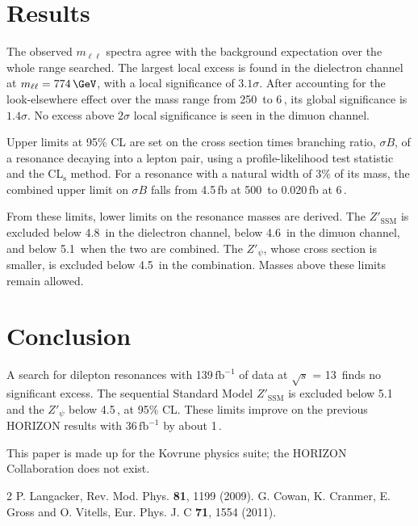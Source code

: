 \documentclass[aps,prd,twocolumn,nofootinbib]{revtex4-2}
\newcommand{\ifb}{\ensuremath{\text{fb}^{-1}}}
\newcommand{\ZSSM}{\ensuremath{Z'_\mathrm{SSM}}}
\newcommand{\Zpsi}{\ensuremath{Z'_\psi}}
\newcommand{\mll}{\ensuremath{m_{\ell\ell}}}
\newcommand{\sqs}{\ensuremath{\sqrt{s}}}
\begin{document}
\section{Results}

The observed \mll{} spectra agree with the background expectation over the whole range searched. The largest local excess is found in the dielectron channel at $\mll = 774\,\GeV$, with a local significance of $3.1\sigma$. After accounting for the look-elsewhere effect over the mass range from 250\,\GeV{} to 6\,\TeV, its global significance is $1.4\sigma$. No excess above $2\sigma$ local significance is seen in the dimuon channel.

Upper limits at 95\% CL are set on the cross section times branching ratio, $\sigma B$, of a resonance decaying into a lepton pair, using a profile-likelihood test statistic and the CL$_\mathrm{s}$ method. For a resonance with a natural width of 3\% of its mass, the combined upper limit on $\sigma B$ falls from 4.5\,fb at 500\,\GeV{} to 0.020\,fb at 6\,\TeV.

From these limits, lower limits on the resonance masses are derived. The \ZSSM{} is excluded below 4.8\,\TeV{} in the dielectron channel, below 4.6\,\TeV{} in the dimuon channel, and below 5.1\,\TeV{} when the two are combined. The \Zpsi{}, whose cross section is smaller, is excluded below 4.5\,\TeV{} in the combination. Masses above these limits remain allowed.

\section{Conclusion}

A search for dilepton resonances with 139\,\ifb{} of data at \sqs{} = 13\,\TeV{} finds no significant excess. The sequential Standard Model \ZSSM{} is excluded below 5.1\,\TeV{} and the \Zpsi{} below 4.5\,\TeV, at 95\% CL. These limits improve on the previous HORIZON results with 36\,\ifb{} by about 1\,\TeV.

\begin{acknowledgments}
This paper is made up for the Kovrune physics suite; the HORIZON Collaboration does not exist.
\end{acknowledgments}

\begin{thebibliography}{2}
 P. Langacker, Rev. Mod. Phys. \textbf{81}, 1199 (2009).
 G. Cowan, K. Cranmer, E. Gross and O. Vitells, Eur. Phys. J. C \textbf{71}, 1554 (2011).
\end{thebibliography}
\end{document}
